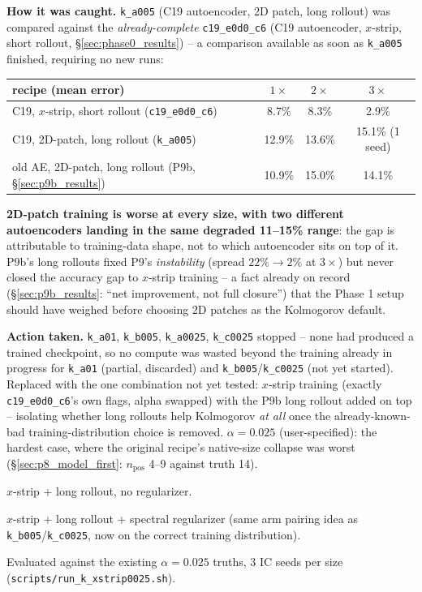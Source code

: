 \documentclass[11pt]{article}
\begin{document}
\textbf{How it was caught.} \texttt{k\_a005} (C19 autoencoder, 2D patch,
long rollout) was compared against the \emph{already-complete}
\texttt{c19\_e0d0\_c6} (C19 autoencoder, $x$-strip, short rollout,
\S\ref{sec:phase0_results}) -- a comparison available as soon as
\texttt{k\_a005} finished, requiring no new runs:
\begin{center}
\small
\begin{tabular}{lccc}
\toprule
recipe (mean error) & $1\times$ & $2\times$ & $3\times$ \\
\midrule
C19, $x$-strip, short rollout (\texttt{c19\_e0d0\_c6}) & 8.7\% & 8.3\% & 2.9\% \\
C19, 2D-patch, long rollout (\texttt{k\_a005}) & 12.9\% & 13.6\% & 15.1\% (1 seed) \\
old AE, 2D-patch, long rollout (P9b, \S\ref{sec:p9b_results}) & 10.9\% & 15.0\% & 14.1\% \\
\bottomrule
\end{tabular}
\end{center}
\textbf{2D-patch training is worse at every size, with two different
autoencoders landing in the same degraded 11--15\% range}: the gap
is attributable to training-data shape, not to which autoencoder sits
on top of it. P9b's long rollouts fixed P9's \emph{instability}
(spread $22\%\to2\%$ at $3\times$) but never closed the accuracy gap to
$x$-strip training -- a fact already on record
(\S\ref{sec:p9b_results}: ``net improvement, not full closure'') that
the Phase 1 setup should have weighed before choosing 2D patches as the
Kolmogorov default.

\textbf{Action taken.} \texttt{k\_a01}, \texttt{k\_b005},
\texttt{k\_a0025}, \texttt{k\_c0025} stopped -- none had produced a
trained checkpoint, so no compute was wasted beyond the training
already in progress for \texttt{k\_a01} (partial, discarded) and
\texttt{k\_b005}/\texttt{k\_c0025} (not yet started). Replaced with the
one combination not yet tested: $x$-strip training (exactly
\texttt{c19\_e0d0\_c6}'s own flags, alpha swapped) with the P9b long
rollout added on top -- isolating whether long rollouts help Kolmogorov
\emph{at all} once the already-known-bad training-distribution choice
is removed. \textbf{$\alpha{=}0.025$} (user-specified): the hardest
case, where the original recipe's native-size collapse was worst
(\S\ref{sec:p8_model_first}: $n_{\mathrm{pos}}$ 4--9 against truth 14).
\begin{description}[leftmargin=*]
\item[\texttt{k\_xs0025}] $x$-strip + long rollout, no regularizer.
\item[\texttt{k\_xsr0025}] $x$-strip + long rollout + spectral
  regularizer (same arm pairing idea as \texttt{k\_b005}/\texttt{k\_c0025},
  now on the correct training distribution).
\end{description}
Evaluated against the existing $\alpha{=}0.025$ truths, 3 IC seeds per
size (\texttt{scripts/run\_k\_xstrip0025.sh}).
\end{document}
